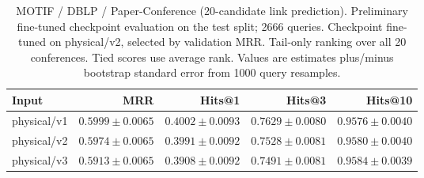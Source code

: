 \begin{table}[t]
\centering
\small
\begin{tabular}{lrrrr}
\toprule
Input & MRR & Hits@1 & Hits@3 & Hits@10 \\
\midrule
physical/v1 & $0.5999 \pm 0.0065$ & $0.4002 \pm 0.0093$ & $0.7629 \pm 0.0080$ & $0.9576 \pm 0.0040$ \\
physical/v2 & $0.5974 \pm 0.0065$ & $0.3991 \pm 0.0092$ & $0.7528 \pm 0.0081$ & $0.9580 \pm 0.0040$ \\
physical/v3 & $0.5913 \pm 0.0065$ & $0.3908 \pm 0.0092$ & $0.7491 \pm 0.0081$ & $0.9584 \pm 0.0039$ \\
\bottomrule
\end{tabular}
\caption{MOTIF / DBLP / Paper-Conference (20-candidate link prediction). Preliminary fine-tuned checkpoint evaluation on the test split; 2666 queries. Checkpoint fine-tuned on physical/v2, selected by validation MRR. Tail-only ranking over all 20 conferences. Tied scores use average rank. Values are estimates plus/minus bootstrap standard error from 1000 query resamples.}
\label{tab:motif-paper_conference-link_prediction}
\end{table}
